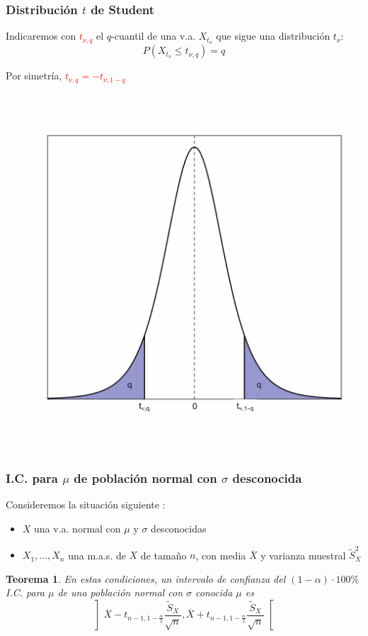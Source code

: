 \documentclass[12pt,t]{beamer}\usepackage[]{graphicx}\usepackage[]{color}
\newcommand{\red}[1]{\textcolor{red}{#1}}
\renewcommand{\leq}{\leqslant}
\theoremstyle{plain}
\newtheorem{teorema}{Teorema}
\theoremstyle{definition}
\begin{document}
\begin{frame}
\frametitle{Distribución $t$ de Student}

Indicaremos con
\red{$t_{\nu,q}$} el  $q$-cuantil de una  v.a.  $X_{t_{\nu}}$ que sigue una distribución $t_\nu$:
$$
P(X_{t_{\nu}}\leq t_{\nu,q})=q
$$

Por simetría,
\red{$t_{\nu,q}=-t_{\nu,1-q}$}
\vspace*{-1ex}

\begin{center}
\includegraphics[width=0.6\linewidth]{quantilt}
\end{center}
\end{frame}



\begin{frame}
\frametitle{I.C. para $\mu$ de población normal con $\sigma$ desconocida}

Consideremos  la situación siguiente  :
\begin{itemize}
\item  $X$ una v.a.  normal con $\mu$ y $\sigma$ desconocidas

\item $X_1,\ldots,X_n$ una m.a.s. de $X$  de  tamaño  $n$, con media   $\overline{X}$ y varianza muestral $\widetilde{S}_X^2$
\end{itemize}


\begin{teorema}
En estas  condiciones, un intervalo  de confianza  del $(1-\alpha)\cdot 100\%$ I.C. para $\mu$ de una población normal con $\sigma$ conocida $\mu$
es 
$$
\left] 
\overline{X}-t_{n-1,1-\frac{\alpha}{2}} \frac{\widetilde{S}_{X}}{\sqrt{n}},
\overline{X}+t_{n-1,1-\frac{\alpha}{2}}\frac{\widetilde{S}_{X}}{\sqrt{n}} \right[
$$
\end{teorema}

\end{frame}
\end{document}
